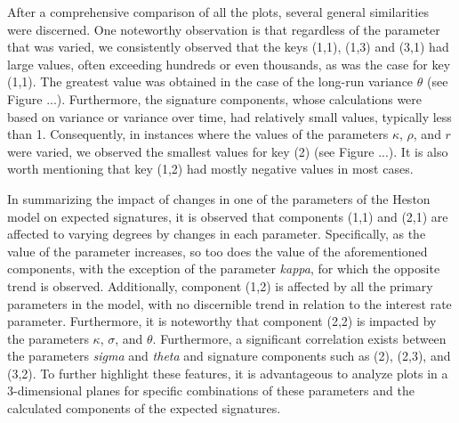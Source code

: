 \documentclass[12pt,a4paper]{report}
\theoremstyle{definition}
\begin{document}
After a comprehensive comparison of all the plots, several general similarities were discerned. One noteworthy observation is that regardless of the parameter that was varied, we consistently observed that the keys (1,1), (1,3) and (3,1) had large values, often exceeding hundreds or even thousands, as was the case for key (1,1). The greatest value was obtained in the case of the long-run variance $\theta$ (see Figure ...). Furthermore, the signature components, whose calculations were based on variance or variance over time, had relatively small values, typically less than 1. Consequently, in instances where the values of the parameters $\kappa$, $\rho$, and $r$ were varied, we observed the smallest values for key (2) (see Figure ...). It is also worth mentioning that key (1,2) had mostly negative values in most cases.

In summarizing the impact of changes in one of the parameters of the Heston model on expected signatures, it is observed that components (1,1) and (2,1) are affected to varying degrees by changes in each parameter. Specifically, as the value of the parameter increases, so too does the value of the aforementioned components, with the exception of the parameter \textit{kappa}, for which the opposite trend is observed. Additionally, component (1,2) is affected by all the primary parameters in the model, with no discernible trend in relation to the interest rate parameter. Furthermore, it is noteworthy that component (2,2) is impacted by the parameters $\kappa$, $\sigma$, and $\theta$. Furthermore, a significant correlation exists between the parameters \textit{sigma} and \textit{theta} and signature components such as (2), (2,3), and (3,2). To further highlight these features, it is advantageous to analyze plots in a 3-dimensional planes for specific combinations of these parameters and the calculated components of the expected signatures.





\end{document}
